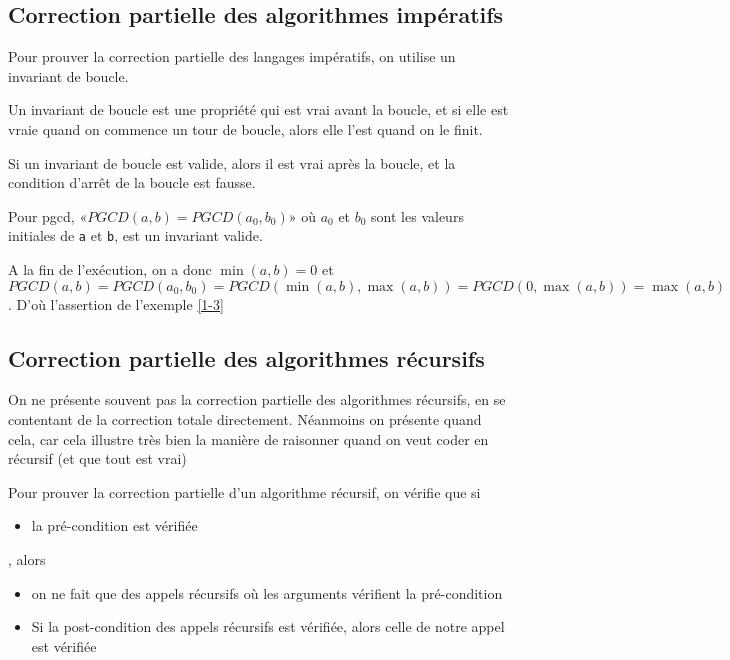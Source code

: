 \subsection{Correction partielle des algorithmes impératifs}

Pour prouver la correction partielle des langages impératifs, on utilise un invariant de boucle.

\begin{definition}
	Un invariant de boucle est une propriété qui est vrai avant la boucle, et si elle est vraie quand on commence un tour de boucle, alors elle l'est quand on le finit.
\end{definition}

\begin{proposition}
	Si un invariant de boucle est valide, alors il est vrai après la boucle, et la condition d'arrêt de la boucle est fausse.
\end{proposition}

\begin{example}
	Pour pgcd, «$PGCD(a,b) = PGCD(a_0, b_0)$» où $a_0$ et $b_0$ sont les valeurs initiales de \texttt{a} et \texttt{b}, est un invariant valide.
	
	A la fin de l'exécution, on a donc $\min(a,b) = 0$ et $PGCD(a,b) = PGCD(a_0, b_0) = PGCD(\min(a,b), \max(a,b)) = PGCD(0, \max(a,b)) = \max(a,b)$. D'où l'assertion de l'exemple \ref{1-3}
\end{example}

\subsection{Correction partielle des algorithmes récursifs}

\begin{com}
	On ne présente souvent pas la correction partielle des algorithmes récursifs, en se contentant de la correction totale directement. Néanmoins on présente quand cela, car cela illustre très bien la manière de raisonner quand on veut coder en récursif (et que tout est vrai)
\end{com}

\begin{principe}
	Pour prouver la correction partielle d'un algorithme récursif, on vérifie que si \begin{itemize}[label=$\bullet$]
		\item la pré-condition est vérifiée
	\end{itemize}, alors
	\begin{itemize}[label=$\bullet$] 
		\item on ne fait que des appels récursifs où les arguments vérifient la pré-condition
		\item Si la post-condition des appels récursifs est vérifiée, alors celle de notre appel est vérifiée
	\end{itemize}
	\label{1-5}
\end{principe}

